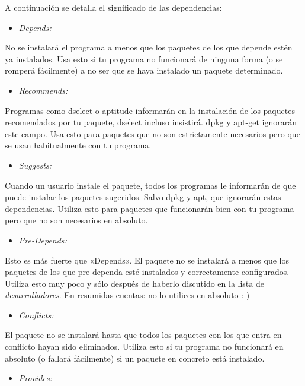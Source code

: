 \documentclass[letterpaper,12pt,spanish]{manual}
\begin{document}
A continuación se detalla el significado de las dependencias:
\begin{itemize}
\item {} 
\emph{Depends:}

\end{itemize}

No se instalará el programa a menos que los paquetes de los que depende estén ya instalados. Usa esto si tu programa no funcionará de ninguna forma (o se romperá fácilmente) a no ser que se haya instalado un paquete determinado.
\begin{itemize}
\item {} 
\emph{Recommends:}

\end{itemize}

Programas como dselect o aptitude informarán en la instalación de los paquetes recomendados por tu paquete, dselect incluso insistirá. dpkg y apt-get ignorarán este campo. Usa esto para paquetes que no son estrictamente necesarios pero que se usan habitualmente con tu programa.
\begin{itemize}
\item {} 
\emph{Suggests:}

\end{itemize}

Cuando un usuario instale el paquete, todos los programas le informarán de que puede instalar los paquetes sugeridos. Salvo dpkg y apt, que ignorarán estas dependencias. Utiliza esto para paquetes que funcionarán bien con tu programa pero que no son necesarios en absoluto.
\begin{itemize}
\item {} 
\emph{Pre-Depends:}

\end{itemize}

Esto es más fuerte que «Depends». El paquete no se instalará a menos que los paquetes de los que pre-dependa esté instalados y correctamente configurados. Utiliza esto muy poco y sólo después de haberlo discutido en la lista de \emph{desarrolladores}. En resumidas cuentas: no lo utilices en absoluto :-)
\begin{itemize}
\item {} 
\emph{Conflicts:}

\end{itemize}

El paquete no se instalará hasta que todos los paquetes con los que entra en conflicto hayan sido eliminados. Utiliza esto si tu programa no funcionará en absoluto (o fallará fácilmente) si un paquete en concreto está instalado.
\begin{itemize}
\item {} 
\emph{Provides:}

\end{itemize}
\end{document}
